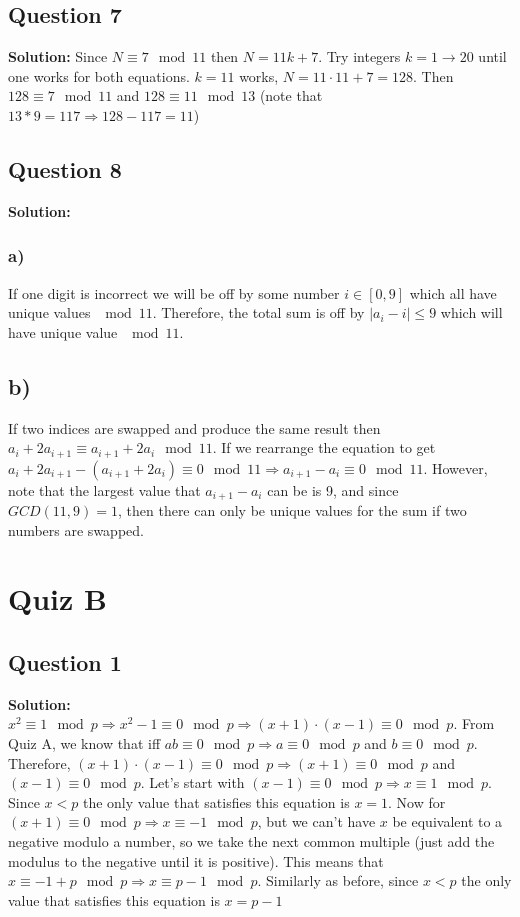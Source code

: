 \documentclass{article}
\begin{document}
\subsection*{Question 7}
\textbf{Solution:} Since $N \equiv 7 \mod 11$ then $N = 11k + 7$. Try integers $k = 1\rightarrow 20$ until one works for both equations. $k = 11$ works, $N = 11\cdot 11 + 7 = 128$. Then $128 \equiv 7 \mod 11$ and $128 \equiv 11 \mod 13$ (note that $13*9 = 117 \Rightarrow 128 - 117 = 11$)

\subsection*{Question 8}
\textbf{Solution:} 
\subsubsection*{a)} If one digit is incorrect we will be off by some number $i \in [0,9]$ which all have unique values $\mod 11$. Therefore, the total sum is off by $|a_i-i| \leq 9$ which will have unique value $\mod 11$.

\subsection*{b)} If two indices are swapped and produce the same result then $a_i + 2a_{i+1} \equiv a_{i+1} + 2a_i \mod 11$. If we rearrange the equation to get $a_i + 2a_{i+1} - (a_{i+1} + 2a_i) \equiv 0 \mod 11 \Rightarrow a_{i+1} - a_i \equiv 0 \mod 11$. However, note that the largest value that $a_{i+1} - a_i$ can be is 9, and since $GCD(11, 9) = 1$, then there can only be unique values for the sum if two numbers are swapped.

\section*{Quiz B}
\subsection*{Question 1}
\textbf{Solution:} $x^2 \equiv 1 \mod p \Rightarrow x^2 - 1 \equiv 0 \mod p \Rightarrow (x+1)\cdot (x-1) \equiv 0 \mod p$. From Quiz A, we know that iff $ab \equiv 0 \mod p \Rightarrow a \equiv 0 \mod p$ and $b \equiv 0 \mod p$. Therefore, $(x+1)\cdot (x-1) \equiv 0 \mod p \Rightarrow (x+1) \equiv 0 \mod p$ and $(x-1)\equiv 0 \mod p$. Let's start with $(x-1)\equiv 0 \mod p \Rightarrow x \equiv 1 \mod p$. Since $x < p$ the only value that satisfies this equation is $x = 1$. Now for $(x+1) \equiv 0 \mod p \Rightarrow x \equiv -1 \mod p$, but we can't have $x$ be equivalent to a negative modulo a number, so we take the next common multiple (just add the modulus to the negative until it is positive). This means that $x \equiv -1 + p \mod p \Rightarrow x \equiv p-1 \mod p$. Similarly as before, since $x < p$ the only value that satisfies this equation is $x = p-1$ 
\end{document}
